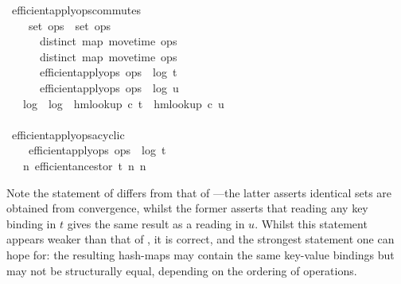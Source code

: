 \documentclass[sigconf]{acmart}
\renewenvironment{isabelle}{%
  \medbreak\noindent%
  \renewcommand{\isanewline}{\\}%
  \begin{minipage}{\columnwidth}%
  \begin{isabellebody}%
  \begin{tabbing}%
}{%
  \end{tabbing}%
  \end{isabellebody}%
  \end{minipage}%
  \medbreak%
}
\renewcommand{\isacartoucheopen}{}
\renewcommand{\isacartoucheclose}{}
\begin{document}
\begin{isabelle}
\isamarkupfalse%
\ efficient{\isacharunderscore}apply{\isacharunderscore}ops{\isacharunderscore}commutes{\isacharcolon}\isanewline
\ \ \ {}{\isacharcolon}\ {\isacartoucheopen}set\ ops{}\ {\isacharequal}\ set\ ops{}{\isacartoucheclose}\isanewline
\ \ \ \ \ {}{\isacharcolon}\ {\isacartoucheopen}distinct\ {\isacharparenleft}map\ move{\isacharunderscore}time\ ops{}{\isacharparenright}{\isacartoucheclose}\isanewline
\ \ \ \ \ {}{\isacharcolon}\ {\isacartoucheopen}distinct\ {\isacharparenleft}map\ move{\isacharunderscore}time\ ops{}{\isacharparenright}{\isacartoucheclose}\isanewline
\ \ \ \ \ {}{\isacharcolon}\ {\isacartoucheopen}efficient{\isacharunderscore}apply{\isacharunderscore}ops\ ops{}\ {\isacharequal}\ {\isacharparenleft}log{}{\isacharcomma}\ t{\isacharparenright}{\isacartoucheclose}\isanewline
\ \ \ \ \ {}{\isacharcolon}\ {\isacartoucheopen}efficient{\isacharunderscore}apply{\isacharunderscore}ops\ ops{}\ {\isacharequal}\ {\isacharparenleft}log{}{\isacharcomma}\ u{\isacharparenright}{\isacartoucheclose}\isanewline
\ \ \ {\isacartoucheopen}log{}\ {\isacharequal}\ log{}\ {\isasymand}\ hm{\isachardot}lookup\ c\ t\ {\isacharequal}\ hm{\isachardot}lookup\ c\ u{\isacartoucheclose}\isanewline
\isanewline
{}\isamarkupfalse%
\ efficient{\isacharunderscore}apply{\isacharunderscore}ops{\isacharunderscore}acyclic{\isacharcolon}\isanewline
\ \ \ {}{\isacharcolon}\ {\isacartoucheopen}efficient{\isacharunderscore}apply{\isacharunderscore}ops\ ops\ {\isacharequal}\ {\isacharparenleft}log{\isacharcomma}\ t{\isacharparenright}{\isacartoucheclose}\isanewline
\ \ \ {\isacartoucheopen}{\isasymnexists}n{\isachardot}\ efficient{\isacharunderscore}ancestor\ t\ n\ n{\isacartoucheclose}
\end{isabelle}

Note the statement of  differs from that of ---the latter asserts identical sets are obtained from convergence, whilst the former asserts that reading any key binding in $t$ gives the same result as a reading in $u$.
Whilst this statement appears weaker than that of , it is correct, and the strongest statement one can hope for: the resulting hash-maps may contain the same key-value bindings but may not be structurally equal, depending on the ordering of operations.
\end{document}
